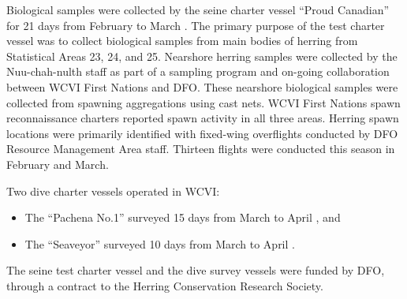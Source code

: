 Biological samples were collected by the seine charter vessel ``Proud Canadian''
for 21 days from February  to March .
The primary purpose of the test charter vessel was to collect biological samples from
main bodies of herring from Statistical Areas 23, 24, and 25.
Nearshore herring samples were collected by the Nuu-chah-nulth staff
as part of a sampling program and on-going collaboration between WCVI First Nations and DFO.
These nearshore biological samples were collected from spawning aggregations using cast nets.
WCVI First Nations spawn reconnaissance charters reported spawn activity in all three areas.
Herring spawn locations were primarily identified with fixed-wing overflights conducted by
DFO Resource Management Area staff.
Thirteen flights were conducted this season in February and March.

Two dive charter vessels operated in WCVI:
\begin{itemize}
\item The ``Pachena No.1'' surveyed 15 days from March  to April , and
\item The ``Seaveyor'' surveyed 10 days from March  to April .
\end{itemize}
The seine test charter vessel and the dive survey vessels were funded by DFO,
through a contract to the Herring Conservation Research Society.
